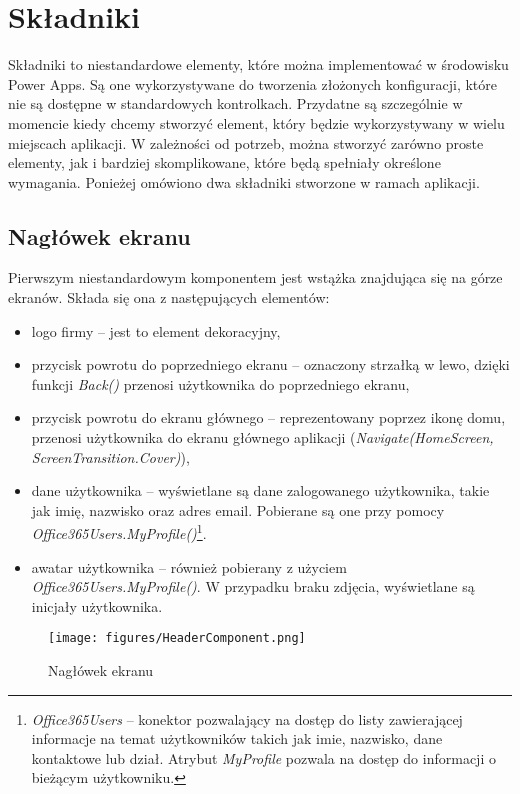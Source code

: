 \section{Składniki}
Składniki to niestandardowe elementy, które można implementować w środowisku Power Apps. Są one wykorzystywane do tworzenia złożonych konfiguracji, które nie są dostępne w standardowych kontrolkach. Przydatne są szczególnie w momencie kiedy chcemy stworzyć element, który będzie wykorzystywany w wielu miejscach aplikacji. W zależności od potrzeb, można stworzyć zarówno proste elementy, jak i bardziej skomplikowane, które będą spełniały określone wymagania. Ponieżej omówiono dwa składniki stworzone w ramach aplikacji.

\subsection{Nagłówek ekranu}
Pierwszym niestandardowym komponentem jest wstążka znajdująca się na górze ekranów. Składa się ona z następujących elementów:
\begin{itemize}
\item logo firmy -- jest to element dekoracyjny,
\item przycisk powrotu do poprzedniego ekranu -- oznaczony strzałką w lewo, dzięki funkcji \textit{Back()} przenosi użytkownika do poprzedniego ekranu,
\item przycisk powrotu do ekranu głównego -- reprezentowany poprzez ikonę domu, przenosi użytkownika do ekranu głównego aplikacji (\emph{Navigate(HomeScreen, ScreenTransition.Cover)}),
\item dane użytkownika -- wyświetlane są dane zalogowanego użytkownika, takie jak imię, nazwisko oraz adres email. Pobierane są one przy pomocy \emph{Office365Users.MyProfile()}\footnote{\emph{Office365Users} -- konektor pozwalający na dostęp do listy zawierającej informacje na temat użytkowników takich jak imie, nazwisko, dane kontaktowe lub dział. Atrybut \emph{MyProfile} pozwala na dostęp do informacji o bieżącym użytkowniku.}. 
\item awatar użytkownika -- również pobierany z użyciem \emph{Office365Users.MyProfile()}. W przypadku braku zdjęcia, wyświetlane są inicjały użytkownika.
\end{itemize}



\begin{figure}[H]
    \centering
    \texttt{[image: figures/HeaderComponent.png]}
    \caption{Nagłówek ekranu} 
    \label{fig:headercomponent}
\end{figure}

